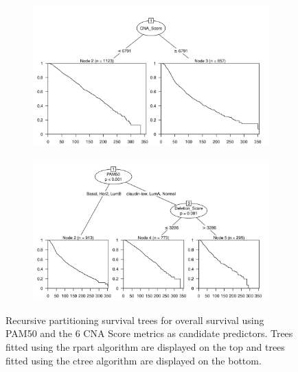 \begin{figure}[!htb]
\centering

\vspace{0.5cm}

\begin{subfigure}{\textwidth}
\subcaption{}
\includegraphics[width=1\textwidth]{../figures/Appendices/Appendix_B/PartyKit_Survival_Score_OS_PAM50.png}
\end{subfigure}

\vspace{2cm}

\begin{subfigure}{\textwidth}
\subcaption{}
\includegraphics[width=1\textwidth]{../figures/Appendices/Appendix_B/Ctree_Survival_Score_OS_PAM50.png}
\end{subfigure}

\vspace{0.5cm}

\caption[Recursive partitioning survival trees for overall survival using PAM50 and the 6 CNA Score metrics as candidate predictors.]{Recursive partitioning survival trees for overall survival using PAM50 and the 6 CNA Score metrics as candidate predictors. Trees fitted using the rpart algorithm are displayed on the top and trees fitted using the ctree algorithm are displayed on the bottom.}
\end{figure}

